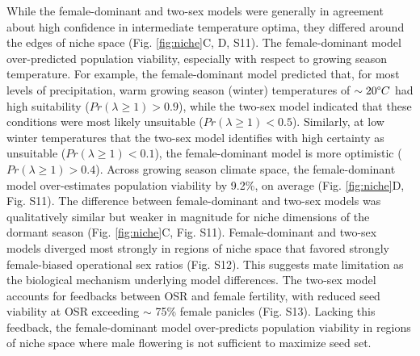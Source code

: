 \documentclass[9pt,twocolumn,twoside,lineno]{pnas-new}
\begin{document}
While the female-dominant and two-sex models were generally in agreement about high confidence in intermediate temperature optima, they differed around the edges of niche space (Fig. \ref{fig:niche}C, D, S11). 
The female-dominant model over-predicted population viability, especially with respect to growing season temperature. 
For example, the female-dominant model predicted that, for most levels of precipitation, warm growing season (winter) temperatures of $\sim 20\degree C$ had high suitability ($Pr(\lambda \ge 1) > 0.9$), while the two-sex model indicated that these conditions were most likely unsuitable ($Pr(\lambda \ge 1) < 0.5$). 
Similarly, at low winter temperatures that the two-sex model identifies with high certainty as unsuitable ($Pr(\lambda \ge 1) < 0.1$), the female-dominant model is more optimistic ($Pr(\lambda \ge 1) > 0.4$). 
Across growing season climate space, the female-dominant model over-estimates population viability by 9.2\%, on average (Fig. \ref{fig:niche}D, Fig. S11). 
The difference between female-dominant and two-sex models was qualitatively similar but weaker in magnitude for niche dimensions of the dormant season (Fig. \ref{fig:niche}C, Fig. S11). 
Female-dominant and two-sex models diverged most strongly in regions of niche space that favored strongly female-biased operational sex ratios (Fig. S12).
This suggests mate limitation as the biological mechanism underlying model differences. 
The two-sex model accounts for feedbacks between OSR and female fertility, with reduced seed viability at OSR exceeding $\sim$ 75\% female panicles (Fig. S13).
Lacking this feedback, the female-dominant model over-predicts population viability in regions of niche space where male flowering is not sufficient to maximize seed set. 
\end{document}

